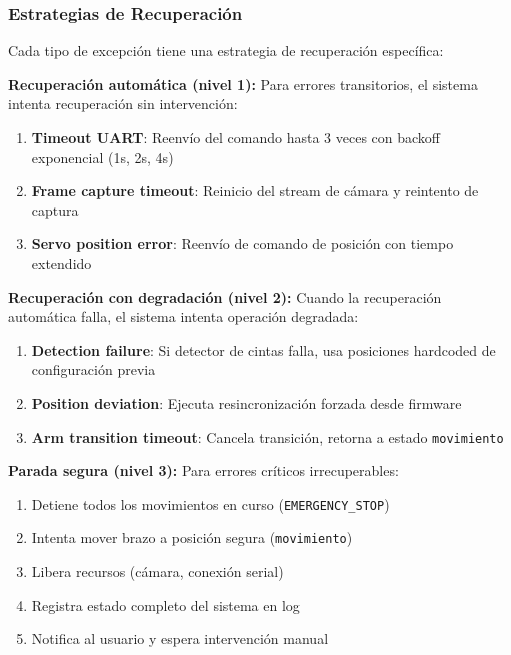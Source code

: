 \subsubsection{Estrategias de Recuperación}

Cada tipo de excepción tiene una estrategia de recuperación específica:

\textbf{Recuperación automática (nivel 1):} Para errores transitorios, el sistema intenta recuperación sin intervención:

\begin{enumerate}
    \item \textbf{Timeout UART}: Reenvío del comando hasta 3 veces con backoff exponencial (1s, 2s, 4s)
    \item \textbf{Frame capture timeout}: Reinicio del stream de cámara y reintento de captura
    \item \textbf{Servo position error}: Reenvío de comando de posición con tiempo extendido
\end{enumerate}

\textbf{Recuperación con degradación (nivel 2):} Cuando la recuperación automática falla, el sistema intenta operación degradada:

\begin{enumerate}
    \item \textbf{Detection failure}: Si detector de cintas falla, usa posiciones hardcoded de configuración previa
    \item \textbf{Position deviation}: Ejecuta resincronización forzada desde firmware
    \item \textbf{Arm transition timeout}: Cancela transición, retorna a estado \texttt{movimiento}
\end{enumerate}

\textbf{Parada segura (nivel 3):} Para errores críticos irrecuperables:

\begin{enumerate}
    \item Detiene todos los movimientos en curso (\texttt{EMERGENCY\_STOP})
    \item Intenta mover brazo a posición segura (\texttt{movimiento})
    \item Libera recursos (cámara, conexión serial)
    \item Registra estado completo del sistema en log
    \item Notifica al usuario y espera intervención manual
\end{enumerate}

